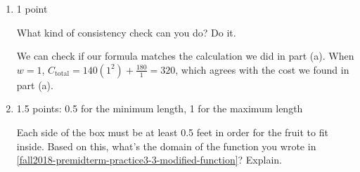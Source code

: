 \documentclass{article}
\providecommand{\check}{}
\renewcommand{\check}{\ifmmode{\text{ \ding{51} }}\else{\ding{51} }\fi}
\begin{document}
\begin{enumerate}
\begin{enumerate}
\begin{solution}
      To write $C_\text{total}$ as a function of $w$, we need to rewrite $\ell$ in terms of $w$ and $h$ in terms of $w$. To
      do this, we can use what we know. Since one side on the bottom is twice as long as the other, $\ell = 2w$. Since the
      volume of the box must be 3 cubic feet, $V = \ell w h = (2w)wh = 3$, so $h = \frac{3}{2w^2}$. Substituting these
      expressions for $\ell$ and $h$ in our formula, we get
       \begin{align*}
      C_\text{total} &= 70(2w)w + 40(2w)(\tfrac{3}{2w^2}) + 40 w(\tfrac{3}{2w^2}) \\
      &= 140w^2 + \frac{120}{w} + \frac{60}{w} \\
      &= \boxed{140w^2 + \frac{180}{w}.}
      \end{align*}
    \end{solution}

  \item

    \begin{grading}
      1 point
    \end{grading}

    \begin{problem}[1in]
      \check What kind of consistency check can you do? Do it. 
    \end{problem}

    \begin{solution}
      We can check if our formula matches the calculation we did in part (a). When $w=1$, 
      $C_\text{total} = 140(1^2) + \frac{180}{1} = 320$, which agrees with the cost we found in part (a). 
    \end{solution}

  \item

    \begin{grading}
      1.5 points: 0.5 for the minimum length, 1 for the maximum length
    \end{grading}

    \begin{problem}[\stretch{0.5}]
      Each side of the box must be at least 0.5 feet in order for the fruit to fit inside. Based on this, what's the domain of the function you wrote in \ref{fall2018-premidterm-practice3-3-modified-function}? Explain. 
    \end{problem}


\end{enumerate}
\end{enumerate}
\end{document}
